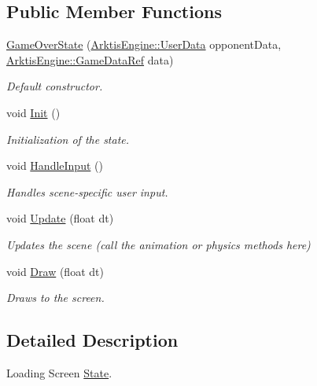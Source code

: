 \subsection*{Public Member Functions}
\begin{DoxyCompactItemize}
\item 
\mbox{\hyperlink{class_states_1_1_game_over_state_a5f860ecbc86851a222086251b76d6067}{Game\+Over\+State}} (\mbox{\hyperlink{struct_arktis_engine_1_1_user_data}{Arktis\+Engine\+::\+User\+Data}} opponent\+Data, \mbox{\hyperlink{namespace_arktis_engine_a52e783ae007274e2a6eccc201d9400a5}{Arktis\+Engine\+::\+Game\+Data\+Ref}} data)
\begin{DoxyCompactList}\small\item\em Default constructor. \end{DoxyCompactList}\item 
void \mbox{\hyperlink{class_states_1_1_game_over_state_a72a8dafbebd94c2964ba48ba4a350096}{Init}} ()
\begin{DoxyCompactList}\small\item\em Initialization of the state. \end{DoxyCompactList}\item 
void \mbox{\hyperlink{class_states_1_1_game_over_state_acc6edd1fdbca63e4564a0a04b9d48811}{Handle\+Input}} ()
\begin{DoxyCompactList}\small\item\em Handles scene-\/specific user input. \end{DoxyCompactList}\item 
void \mbox{\hyperlink{class_states_1_1_game_over_state_a8efab9044baa73dbe979b6da0aa9a041}{Update}} (float dt)
\begin{DoxyCompactList}\small\item\em Updates the scene (call the animation or physics methods here) \end{DoxyCompactList}\item 
void \mbox{\hyperlink{class_states_1_1_game_over_state_ac017a6a3acb091ae1596dbf9e5c38643}{Draw}} (float dt)
\begin{DoxyCompactList}\small\item\em Draws to the screen. \end{DoxyCompactList}\end{DoxyCompactItemize}


\subsection{Detailed Description}
Loading Screen \mbox{\hyperlink{class_states_1_1_state}{State}}. 

